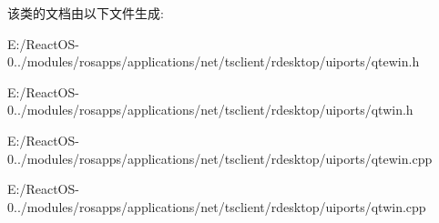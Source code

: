 该类的文档由以下文件生成\+:\begin{DoxyCompactItemize}
\item 
E\+:/\+React\+O\+S-\/0../modules/rosapps/applications/net/tsclient/rdesktop/uiports/qtewin.\+h\item 
E\+:/\+React\+O\+S-\/0../modules/rosapps/applications/net/tsclient/rdesktop/uiports/qtwin.\+h\item 
E\+:/\+React\+O\+S-\/0../modules/rosapps/applications/net/tsclient/rdesktop/uiports/qtewin.\+cpp\item 
E\+:/\+React\+O\+S-\/0../modules/rosapps/applications/net/tsclient/rdesktop/uiports/qtwin.\+cpp\end{DoxyCompactItemize}
